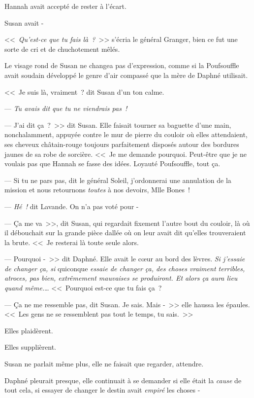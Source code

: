 Hannah avait accepté de rester à l'écart.

Susan avait -

\later

<<~\emph{Qu'est-ce que tu fais là~?}~>> s'écria le général Granger, bien ce fut une sorte de cri et de chuchotement mêlés.

Le visage rond de Susan ne changea pas d'expression, comme si la Poufsouffle avait soudain développé le genre d'air compassé que la mère de Daphné utilisait.

<<~Je suis là, vraiment~? dit Susan d'un ton calme.

--- \emph{Tu avais dit que tu ne viendrais pas~!}

--- J'ai dit ça~?~>> dit Susan. Elle faisait tourner sa baguette d'une main, nonchalamment, appuyée contre le mur de pierre du couloir où elles attendaient, ses cheveux châtain-rouge toujours parfaitement disposés autour des bordures jaunes de sa robe de sorcière. <<~Je me demande pourquoi. Peut-être que je ne voulais pas que Hannah se fasse des idées. Loyauté Poufsouffle, tout ça.

--- Si tu ne pars pas, dit le général Soleil, j'ordonnerai une annulation de la mission et nous retournons \emph{toutes} à nos devoirs, Mlle Bones~!

--- \emph{Hé~!} dit Lavande. On n'a pas voté pour -

--- Ça me va~>>, dit Susan, qui regardait fixement l'autre bout du couloir, là où il débouchait sur la grande pièce dallée où on leur avait dit qu'elles trouveraient la brute. <<~Je resterai là toute seule alors.

--- Pourquoi -~>> dit Daphné. Elle avait le cœur au bord des lèvres. \emph{Si j'essaie de changer ça, si} quiconque \emph{essaie de changer ça, des choses vraiment terribles, atroces, pas bien, extrêmement mauvaises se produiront. Et alors ça aura lieu quand même.}… <<~Pourquoi est-ce que tu fais ça~?

--- Ça ne me ressemble pas, dit Susan. Je sais. Mais -~>> elle haussa les épaules. <<~Les gens ne se ressemblent pas tout le temps, tu sais.~>>

Elles plaidèrent.

Elles supplièrent.

Susan ne parlait même plus, elle ne faisait que regarder, attendre.

Daphné pleurait presque, elle continuait à se demander si elle était la \emph{cause} de tout cela, si essayer de changer le destin avait \emph{empiré} les choses -

